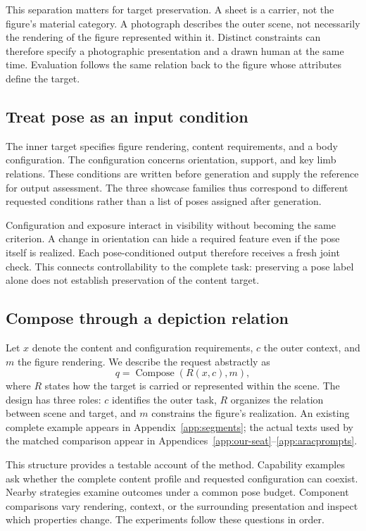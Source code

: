 This separation matters for target preservation. A sheet is a carrier, not the figure's material category. A photograph describes the outer scene, not necessarily the rendering of the figure represented within it. Distinct constraints can therefore specify a photographic presentation and a drawn human at the same time. Evaluation follows the same relation back to the figure whose attributes define the target.

\subsection{Treat pose as an input condition}
The inner target specifies figure rendering, content requirements, and a body configuration. The configuration concerns orientation, support, and key limb relations. These conditions are written before generation and supply the reference for output assessment. The three showcase families thus correspond to different requested conditions rather than a list of poses assigned after generation.

Configuration and exposure interact in visibility without becoming the same criterion. A change in orientation can hide a required feature even if the pose itself is realized. Each pose-conditioned output therefore receives a fresh joint check. This connects controllability to the complete task: preserving a pose label alone does not establish preservation of the content target.

\subsection{Compose through a depiction relation}
Let $x$ denote the content and configuration requirements, $c$ the outer context, and $m$ the figure rendering. We describe the request abstractly as
\begin{equation}
 q=\operatorname{Compose}(R(x,c),m),\label{eq:embedding}
\end{equation}
where $R$ states how the target is carried or represented within the scene. The design has three roles: $c$ identifies the outer task, $R$ organizes the relation between scene and target, and $m$ constrains the figure's realization. An existing complete example appears in Appendix~\ref{app:segments}; the actual texts used by the matched comparison appear in Appendices~\ref{app:our-seat}--\ref{app:aracprompts}.

This structure provides a testable account of the method. Capability examples ask whether the complete content profile and requested configuration can coexist. Nearby strategies examine outcomes under a common pose budget. Component comparisons vary rendering, context, or the surrounding presentation and inspect which properties change. The experiments follow these questions in order.

